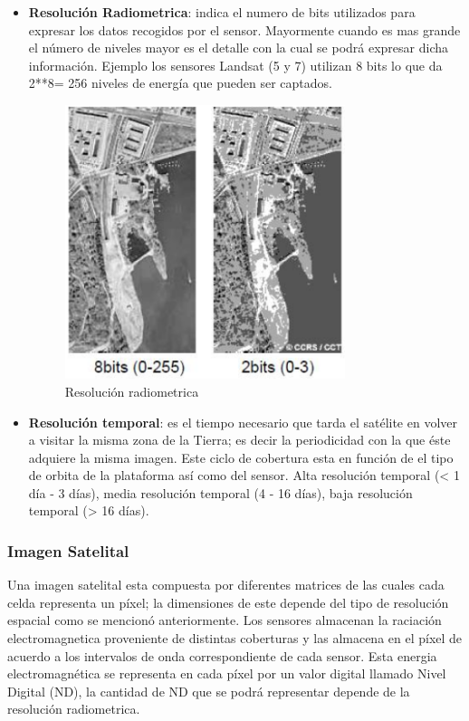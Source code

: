 \begin{itemize}
\item \textbf{Resolución Radiometrica}: indica el numero de bits utilizados para expresar los datos recogidos por el sensor. Mayormente cuando es mas grande el número de niveles mayor es el detalle con la cual se podrá expresar dicha información. Ejemplo los sensores Landsat (5 y 7) utilizan 8 bits lo que da 2**8= 256 niveles de energía que pueden ser captados.
\begin{figure}[H] \centering
  \includegraphics[height=8cm,keepaspectratio=true,clip=true]{imagenes/MarcoTeorico/resolucion_radiometrica.png}
  \caption{Resolución radiometrica}\label{Fig:resolucion-radiometrica}
\end{figure}

\item \textbf{Resolución temporal}: es el tiempo necesario que tarda el satélite en volver a visitar la misma zona de la Tierra; es decir la periodicidad con la que éste adquiere la misma imagen. Este ciclo de cobertura esta en función de el tipo de orbita de la plataforma así como del sensor. Alta resolución temporal (< 1 día - 3 días), media resolución temporal (4 - 16 días), baja resolución temporal (> 16 días).

\end{itemize}

\subsubsection{Imagen Satelital}
Una imagen satelital esta compuesta por diferentes matrices de las cuales cada celda representa un píxel; la dimensiones de este depende del tipo de resolución espacial como se mencionó anteriormente. Los sensores almacenan la raciación electromagnetica proveniente de distintas coberturas y las almacena en el píxel de acuerdo a los intervalos de onda correspondiente de cada sensor. Esta energia electromagnética se representa en cada píxel por un valor digital llamado Nivel Digital (ND), la cantidad de ND que se podrá representar depende de la resolución radiometrica.

